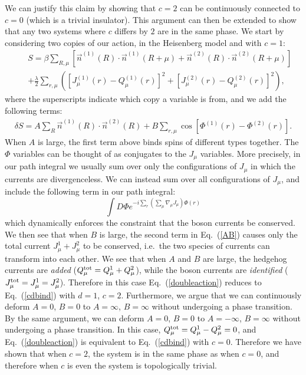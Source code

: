 \documentclass[prb,twocolumn]{revtex4-1}
\begin{document}
We can justify this claim by showing that $c=2$ can be continuously connected to $c=0$ (which is a trivial insulator). This argument can then be extended to show that any two systems where $c$ differs by $2$ are in the same phase.
We start by considering two copies of our action, in the Heisenberg model and with $c=1$:
\begin{eqnarray}
&&S=\beta\sum_{R,\mu}\left[ \vec{n}^{(1)}(R)\cdot \vec{n}^{(1)}(R+\mu)+\vec{n}^{(2)}(R)\cdot \vec{n}^{(2)}(R+\mu)\right]\nonumber\\
&&+\frac{\lambda}{2}\sum_{r,\mu}\left( [ J_\mu^{(1)}(r)- Q_\mu^{(1)}(r)]^2+[ J_\mu^{(2)}(r)- Q_\mu^{(2)}(r)]^2\right),
\label{doubleaction}
\end{eqnarray}
where the superscripts indicate which copy a variable is from, and we add the following terms:
\begin{eqnarray}
\delta S=A\sum_{R} \vec{n}^{(1)}(R)\cdot \vec{n}^{(2)}(R)+B\sum_{r,\mu} \cos[\Phi^{(1)}(r)-\Phi^{(2)}(r)].
\label{AB}
\end{eqnarray} 
When $A$ is large, the first term above binds spins of different types together. The $\Phi$ variables can be thought of as conjugates to the $J_\mu$ variables. More precisely, in our path integral we usually sum over only the configurations of $J_\mu$ in which the currents are divergenceless. We can instead sum over all configurations of $J_\mu$, and include the following term in our path integral:
\begin{equation}
\int D\Phi e^{-i\sum_r (\sum_\mu\nabla_\mu J_\mu)\Phi(r)}
\end{equation}
which dynamically enforces the constraint that the boson currents be conserved. We then see that when $B$ is large, the second term in Eq.~(\ref{AB}) causes only the total current $J_\mu^1+J_\mu^2$ to be conserved, i.e.~the two species of currents can transform into each other. We see that when $A$ and $B$ are large, the hedgehog currents are \emph{added} ($Q^{\rm tot}_\mu=Q_\mu^1+Q_\mu^2$), while the boson currents are \emph{identified} ($J^{\rm tot}_\mu=J^1_\mu=J^2_\mu$). Therefore in this case Eq.~(\ref{doubleaction}) reduces to Eq.~(\ref{cdbind}) with $d=1$, $c=2$. Furthermore, we argue that we can continuously deform $A=0$, $B=0$ to $A=\infty$, $B=\infty$ without undergoing a phase transition. By the same argument, we can deform $A=0$, $B=0$ to $A=-\infty$, $B=\infty$ without undergoing a phase transition. In this case, $Q^{\rm tot}_\mu=Q_\mu^1-Q_\mu^2=0$, and Eq.~(\ref{doubleaction}) is equivalent to Eq.~(\ref{cdbind}) with $c=0$. Therefore we have shown that when $c=2$, the system is in the same phase as when $c=0$, and therefore when $c$ is even the system is topologically trivial.
\end{document}
